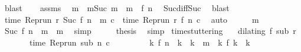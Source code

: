 \begin{isabellebody}
\ blast\isanewline
\ \ \isamarkupfalse%
\ assms{\isacharparenleft}{}{\isacharparenright}\ \isamarkupfalse%
\ m\ \ m{}{\isacharcolon}{\isacartoucheopen}Suc\ m\ {\isacharequal}\ m\ {\isacharminus}\ {\isacharparenleft}f\ n{\isacharparenright}{\isacartoucheclose}\ \isamarkupfalse%
\ Suc{\isacharunderscore}diff{\isacharunderscore}Suc\ \isamarkupfalse%
\ blast\isanewline
\ \ \isamarkupfalse%
\ {\isacharasterisk}\ \isamarkupfalse%
\ {\isacartoucheopen}time\ {\isacharparenleft}{\isacharparenleft}Rep{\isacharunderscore}run\ r{\isacharparenright}\ {\isacharparenleft}Suc\ {\isacharparenleft}{\isacharparenleft}f\ n{\isacharparenright}\ {\isacharplus}\ m\ c{\isacharparenright}\ {\isacharequal}\ time\ {\isacharparenleft}{\isacharparenleft}Rep{\isacharunderscore}run\ r{\isacharparenright}\ {\isacharparenleft}f\ n{\isacharparenright}\ c{\isacharparenright}{\isacartoucheclose}\ \isamarkupfalse%
\ auto\isanewline
\ \ \isamarkupfalse%
\ \isamarkupfalse%
\ m{}\ \isamarkupfalse%
\ {\isacartoucheopen}Suc\ {\isacharparenleft}{\isacharparenleft}f\ n{\isacharparenright}\ {\isacharplus}\ m\ {\isacharequal}\ m{\isacartoucheclose}\ \isamarkupfalse%
\ simp\isanewline
\ \ \isamarkupfalse%
\ \isamarkupfalse%
\ {\isacharquery}thesis\ \isamarkupfalse%
\ simp\isanewline
{}\isamarkupfalse%
%
\endisatagproof
{\isafoldproof}%
%
\isadelimproof
\isanewline
%
\endisadelimproof
\isanewline
{}\isamarkupfalse%
\ time{\isacharunderscore}stuttering{\isacharcolon}\isanewline
\ \ \ {\isacartoucheopen}dilating\ f\ sub\ r{\isacartoucheclose}\isanewline
\ \ \ \ \ \ \ {\isacartoucheopen}time\ {\isacharparenleft}{\isacharparenleft}Rep{\isacharunderscore}run\ sub{\isacharparenright}\ n\ c{\isacharparenright}\ {\isacharequal}\ {\isasymtau}{\isacartoucheclose}\isanewline
\ \ \ \ \ \ \ {\isacartoucheopen}{\isasymAnd}k{\isachardot}\ f\ n\ {\isacharless}\ k\ {\isasymand}\ k\ {\isasymle}\ m\ {\isasymLongrightarrow}\ {\isacharparenleft}{\isasymnexists}k\ f\ k\ {\isacharequal}\ k{\isacharparenright}{\isacartoucheclose}\isanewline

\end{isabellebody}
